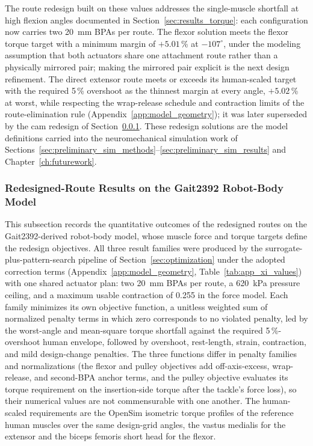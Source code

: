 The route redesign built on these values addresses the single-muscle shortfall at high flexion angles documented in Section~\ref{sec:results_torque}: each configuration now carries two \qty{20}{\mm} BPAs per route. The flexor solution meets the flexor torque target with a minimum margin of $+5.01$\,\% at $-107^{\circ}$, under the modeling assumption that both actuators share one attachment route rather than a physically mirrored pair; making the mirrored pair explicit is the next design refinement. The direct extensor route meets or exceeds its human-scaled target with the required 5\,\% overshoot as the thinnest margin at every angle, $+5.02$\,\% at worst, while respecting the wrap-release schedule and contraction limits of the route-elimination rule (Appendix~\ref{app:model_geometry}); it was later superseded by the cam redesign of Section~\ref{sec:route_redesign_results}. These redesign solutions are the model definitions carried into the neuromechanical simulation work of Sections~\ref{sec:preliminary_sim_methods}--\ref{sec:preliminary_sim_results} and Chapter~\ref{ch:futurework}.

\subsubsection{Redesigned-Route Results on the Gait2392 Robot-Body Model}\label{sec:route_redesign_results}

This subsection records the quantitative outcomes of the redesigned routes on the Gait2392-derived robot-body model, whose muscle force and torque targets define the redesign objectives. All three result families were produced by the surrogate-plus-pattern-search pipeline of Section~\ref{sec:optimization} under the adopted correction terms (Appendix~\ref{app:model_geometry}, Table~\ref{tab:app_xi_values}) with one shared actuator plan: two \qty{20}{\mm} BPAs per route, a \qty{620}{\kPa} pressure ceiling, and a maximum usable contraction of 0.255 in the force model. Each family minimizes its own objective function, a unitless weighted sum of normalized penalty terms in which zero corresponds to no violated penalty, led by the worst-angle and mean-square torque shortfall against the required 5\,\%-overshoot human envelope, followed by overshoot, rest-length, strain, contraction, and mild design-change penalties. The three functions differ in penalty families and normalizations (the flexor and pulley objectives add off-axis-excess, wrap-release, and second-BPA anchor terms, and the pulley objective evaluates its torque requirement on the insertion-side torque after the tackle's force loss), so their numerical values are not commensurable with one another. The human-scaled requirements are the OpenSim isometric torque profiles of the reference human muscles over the same design-grid angles, the vastus medialis for the extensor and the biceps femoris short head for the flexor.

